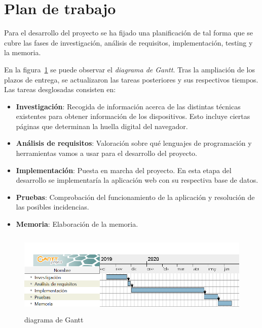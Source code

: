 \section{Plan de trabajo}
Para el desarrollo del proyecto se ha fijado una planificación de tal forma que se cubre las fases de investigación, análisis de requisitos, implementación, testing y la memoria.\par
En la figura~\ref{fig:diagramaGantt} se puede observar el \textit{diagrama de Gantt}. Tras la ampliación de los plazos de entrega, se actualizaron las tareas posteriores y sus respectivos tiempos. Las tareas desglosadas consisten en:
\begin{itemize}
    \item \textbf{Investigación}: Recogida de información acerca de las distintas técnicas existentes\cite{Huella} para obtener información de los dispositivos. Esto incluye ciertas páginas que determinan la huella digital del navegador\cite{amiunique}.
    \item \textbf{Análisis de requisitos}: Valoración sobre qué lenguajes de programación y herramientas vamos a usar para el desarrollo del proyecto.
    \item \textbf{Implementación}: Puesta en marcha del proyecto. En esta etapa del desarrollo se implementaría la aplicación web con su respectiva base de datos.
    \item \textbf{Pruebas}: Comprobación del funcionamiento de la aplicación y resolución de las posibles incidencias.
    \item \textbf{Memoria}: Elaboración de la memoria.
\end{itemize}
\begin{figure}[b]
    \includegraphics[width=1\textwidth, height=4cm]{Images/diagramaGantt.png}
    \caption{diagrama de Gantt}
    \label{fig:diagramaGantt}
\end{figure}
